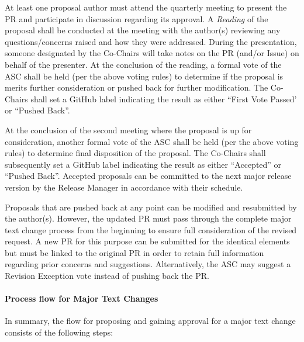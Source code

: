 \documentclass{article}
\begin{document}
At least one proposal author must attend the quarterly meeting to
present the PR and participate in discussion regarding its approval. A
\textit{Reading} of the proposal shall be conducted at the meeting with the
author(s) reviewing any questions/concerns raised and how they were
addressed. During the presentation, someone designated by the Co-Chairs
will take notes on the PR (and/or Issue) on behalf of the presenter.
At the conclusion of the reading, a formal vote of the ASC shall be held
(per the above voting rules) to determine if the proposal is merits further
consideration or pushed back for further modification.
The Co-Chairs shall set a GitHub label indicating the
result as either ``First Vote Passed' or ``Pushed Back''.

At the conclusion of the second meeting where the proposal is up for
consideration, another formal vote of the ASC shall be held (per the
above voting rules) to determine final disposition of the proposal. The
Co-Chairs shall subsequently set a GitHub label indicating the result as
either ``Accepted'' or ``Pushed Back''. Accepted
proposals can be committed to the next major release version by the
Release Manager in accordance with their schedule.

Proposals that are pushed back at any point can be modified and
resubmitted by the author(s). However, the updated PR must pass through
the complete major text change process from the beginning to ensure full
consideration of the revised request. A new PR for this purpose can be
submitted for the identical elements but must be linked to the original
PR in order to retain full information regarding prior concerns and
suggestions. Alternatively, the ASC may suggest a Revision Exception vote
instead of pushing back the PR.

\hypertarget{process-flow-for-major-text-changes}{%
\paragraph{Process flow for Major Text Changes}%
\label{process-flow-for-major-text-changes}}

In summary, the flow for proposing and gaining approval for a major text
change consists of the following steps:
\end{document}
